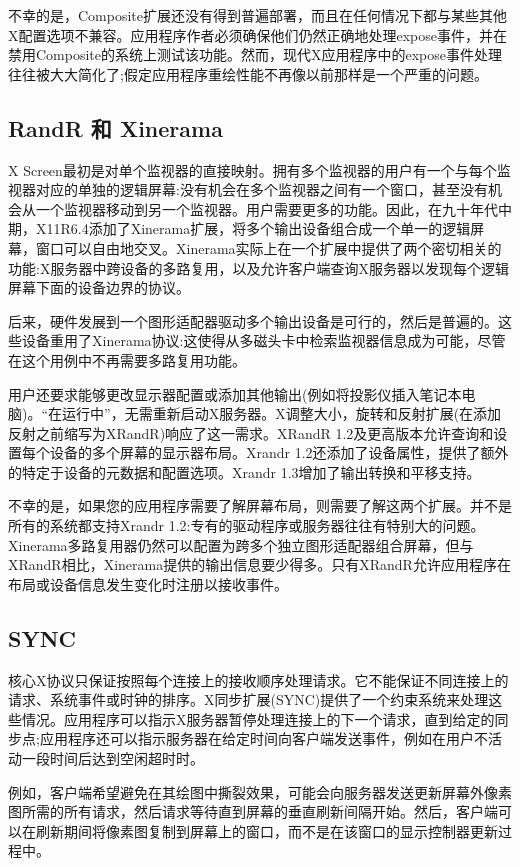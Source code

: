 不幸的是，Composite扩展还没有得到普遍部署，而且在任何情况下都与某些其他X配置选项不兼容。应用程序作者必须确保他们仍然正确地处理expose事件，并在禁用Composite的系统上测试该功能。然而，现代X应用程序中的expose事件处理往往被大大简化了;假定应用程序重绘性能不再像以前那样是一个严重的问题。


\subsection{RandR 和 Xinerama}

X Screen最初是对单个监视器的直接映射。拥有多个监视器的用户有一个与每个监视器对应的单独的逻辑屏幕:没有机会在多个监视器之间有一个窗口，甚至没有机会从一个监视器移动到另一个监视器。用户需要更多的功能。因此，在九十年代中期，X11R6.4添加了Xinerama扩展，将多个输出设备组合成一个单一的逻辑屏幕，窗口可以自由地交叉。Xinerama实际上在一个扩展中提供了两个密切相关的功能:X服务器中跨设备的多路复用，以及允许客户端查询X服务器以发现每个逻辑屏幕下面的设备边界的协议。

后来，硬件发展到一个图形适配器驱动多个输出设备是可行的，然后是普遍的。这些设备重用了Xinerama协议:这使得从多磁头卡中检索监视器信息成为可能，尽管在这个用例中不再需要多路复用功能。

用户还要求能够更改显示器配置或添加其他输出(例如将投影仪插入笔记本电脑)。“在运行中”，无需重新启动X服务器。X调整大小，旋转和反射扩展(在添加反射之前缩写为XRandR)响应了这一需求。XRandR 1.2及更高版本允许查询和设置每个设备的多个屏幕的显示器布局。Xrandr 1.2还添加了设备属性，提供了额外的特定于设备的元数据和配置选项。Xrandr 1.3增加了输出转换和平移支持。

不幸的是，如果您的应用程序需要了解屏幕布局，则需要了解这两个扩展。并不是所有的系统都支持Xrandr 1.2:专有的驱动程序或服务器往往有特别大的问题。Xinerama多路复用器仍然可以配置为跨多个独立图形适配器组合屏幕，但与XRandR相比，Xinerama提供的输出信息要少得多。只有XRandR允许应用程序在布局或设备信息发生变化时注册以接收事件。

\subsection{SYNC}

核心X协议只保证按照每个连接上的接收顺序处理请求。它不能保证不同连接上的请求、系统事件或时钟的排序。X同步扩展(SYNC)提供了一个约束系统来处理这些情况。应用程序可以指示X服务器暂停处理连接上的下一个请求，直到给定的同步点;应用程序还可以指示服务器在给定时间向客户端发送事件，例如在用户不活动一段时间后达到空闲超时时。

例如，客户端希望避免在其绘图中撕裂效果，可能会向服务器发送更新屏幕外像素图所需的所有请求，然后请求等待直到屏幕的垂直刷新间隔开始。然后，客户端可以在刷新期间将像素图复制到屏幕上的窗口，而不是在该窗口的显示控制器更新过程中。

